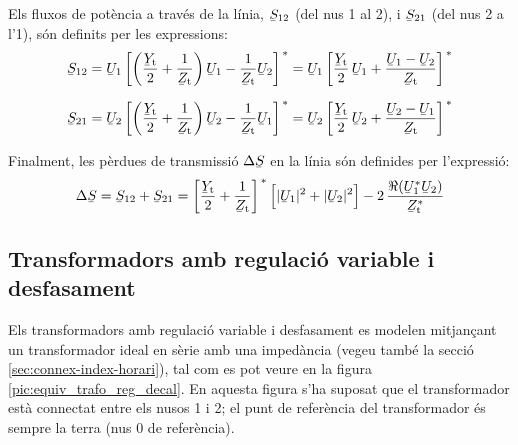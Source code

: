 Els fluxos de potència a través de la línia, $\cmplx{S}_{12}$ (del
nus 1 al 2), i $\cmplx{S}_{21}$ (del nus 2 a l'1), són definits per
les expressions:
\begin{align}
   \cmplx{S}_{12} &= \cmplx{U}_1 \left[ \left( \frac{\cmplx{Y}\ped{t}}{2} + \frac{1}{\cmplx{Z}\ped{t}} \right) \cmplx{U}_1 - \frac{1}{\cmplx{Z}\ped{t}} \cmplx{U}_2 \right]^{\,*} = \cmplx{U}_1 \left[ \frac{\cmplx{Y}\ped{t}}{2}\, \cmplx{U}_1 + \frac{\cmplx{U}_1 - \cmplx{U}_2}{\cmplx{Z}\ped{t}} \right]^{\,*} \label{eq:lin_s12}
   \\[1.5ex]
   \cmplx{S}_{21} &= \cmplx{U}_2 \left[ \left( \frac{\cmplx{Y}\ped{t}}{2} + \frac{1}{\cmplx{Z}\ped{t}} \right) \cmplx{U}_2 - \frac{1}{\cmplx{Z}\ped{t}} \cmplx{U}_1 \right]^{\,*} = \cmplx{U}_2 \left[ \frac{\cmplx{Y}\ped{t}}{2} \,\cmplx{U}_2 + \frac{\cmplx{U}_2 - \cmplx{U}_1}{\cmplx{Z}\ped{t}} \right]^{\,*} \label{eq:lin_s21}
\end{align}

Finalment, les pèrdues de transmissió $\Delta\cmplx{S}$ en la  línia són definides per
l'expressió:
\begin{equation}
   \Delta\cmplx{S} = \cmplx{S}_{12} + \cmplx{S}_{21} = \left[ \frac{\cmplx{Y}\ped{t}}{2} + \frac{1}{\cmplx{Z}\ped{t}} \right]^{\,*} \Big[ |\cmplx{U}_1|^2 + |\cmplx{U}_2|^2 \Big] - 2 \, \frac{\Re (\cmplx{U}_1^* \cmplx{U}_2)}{\cmplx{Z}\ped{t}^*}
\end{equation}

\subsection{Transformadors amb regulació variable i desfasament}

Els transformadors amb regulació variable i desfasament es modelen
mitjançant un transformador ideal en sèrie amb una impedància
(vegeu també la secció \ref{sec:connex-index-horari}), tal
com es pot veure en la figura \vref{pic:equiv_trafo_reg_decal}. En
aquesta figura s'ha suposat que el transformador està connectat
entre els nusos 1 i 2; el punt de referència del transformador és
sempre  la terra (nus 0 de referència). 

\begin{center}
    
    \label{pic:equiv_trafo_reg_decal}
\end{center}

